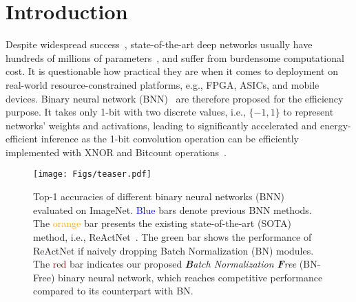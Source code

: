 \documentclass[final]{cvpr}
\begin{document}
\section{Introduction}
Despite widespread success~\cite{szegedy2015going,he2016deep,ren2015faster,redmon2016you,long2015fully,chen2017rethinking,pan2016shallow}, state-of-the-art deep networks usually have hundreds of millions of parameters~\cite{brock2021agc,jia2021scaling,pham2020meta}, and suffer from burdensome computational cost. It is questionable how practical they are when it comes to deployment on real-world resource-constrained platforms, e.g., FPGA, ASICs, and mobile devices. Binary neural network (BNN)~\cite{courbariaux2016binarized,courbariaux2015binaryconnect,qin2020binary,rastegari2016xnor,zhou2016dorefa} are therefore proposed for the efficiency purpose. It takes only 1-bit with two discrete values, i.e., $\{-1, 1\}$ to represent networks' weights and activations, leading to significantly accelerated and energy-efficient inference as the 1-bit convolution operation can be efficiently implemented with XNOR and Bitcount operations~\cite{rastegari2016xnor}. 

\begin{figure}[tb]
    \centering
    \texttt{[image: Figs/teaser.pdf]}
    \caption{Top-1 accuracies of different binary neural networks (BNN) evaluated on ImageNet. \textcolor{blue}{Blue} bars denote previous BNN methods. The \textcolor{orange}{orange} bar presents the existing state-of-the-art (SOTA) method, i.e., ReActNet~\cite{liu2020reactnet}. The \textcolor{OliveGreen}{green} bar shows the performance of ReActNet if naively dropping Batch Normalization (BN) modules. The \textcolor{Maroon}{red} bar indicates our proposed \textit{\textbf{B}atch Normalization \textbf{F}ree} (BN-Free) binary neural network, which reaches competitive performance compared to its counterpart with BN.}
    \label{fig:teaser}
\end{figure}
\end{document}
